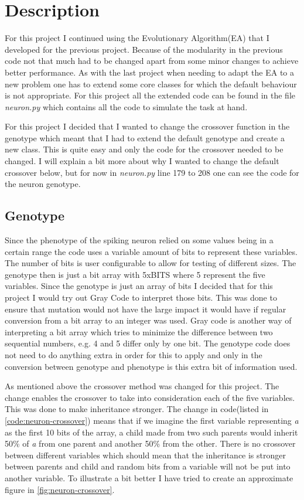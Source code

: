 \section{Description}\label{sec:description}
For this project I continued using the Evolutionary Algorithm(EA) that I
developed for the previous project. Because of the modularity in the previous
code not that much had to be changed apart from some minor changes to achieve
better performance. As with the last project when needing to adapt the EA to a
new problem one has to extend some core classes for which the default behaviour
is not appropriate. For this project all the extended code can be found in the
file \textit{neuron.py} which contains all the code to simulate the task at
hand.

For this project I decided that I wanted to change the crossover function in the
genotype which meant that I had to extend the default genotype and create a new
class. This is quite easy and only the code for the crossover needed to be
changed. I will explain a bit more about why I wanted to change the default
crossover below, but for now in \textit{neuron.py} line 179 to 208 one can see
the code for the neuron genotype.

\subsection{Genotype}\label{sec:genotype-description}
Since the phenotype of the spiking neuron relied on some values being in a
certain range the code uses a variable amount of bits to represent these
variables. The number of bits is user configurable to allow for testing of
different sizes. The genotype then is just a bit array with 5xBITS where 5 represent
the five variables. Since the genotype is just an array of bits I decided that
for this project I would try out Gray Code to interpret those bits. This was
done to ensure that mutation would not have the large impact it would have if
regular conversion from a bit array to an integer was used. Gray code is another
way of interpreting a bit array which tries to minimize the difference between
two sequential numbers, e.g. 4 and 5 differ only by one bit. The genotype code
does not need to do anything extra in order for this to apply and only in the
conversion between genotype and phenotype is this extra bit of information used.

As mentioned above the crossover method was changed for this project. The change
enables the crossover to take into consideration each of the five variables.
This was done to make inheritance stronger. The change in code(listed in
\ref{code:neuron-crossover}) means that if we imagine the first variable
representing \textit{a} as the first 10 bits of the array, a child made from two
such parents would inherit 50\% of \textit{a} from one parent and another 50\%
from the other. There is no crossover between different variables which should
mean that the inheritance is stronger between parents and child and random bits
from a variable will not be put into another variable. To illustrate a bit
better I have tried to create an approximate figure in
\ref{fig:neuron-crossover}.

